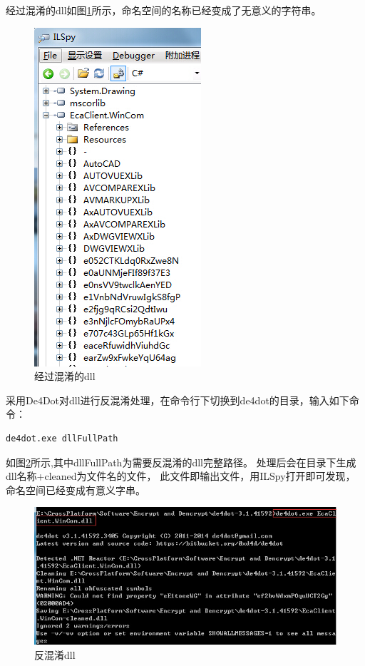 \documentclass{book}
\begin{document}
经过混淆的dll如图\ref{CodeObfuscation}所示，命名空间的名称已经变成了无意义的字符串。

\begin{figure}[htbp]
	\centering
	\includegraphics[scale=0.8]{CodeObfuscation.jpg}
	\caption{经过混淆的dll}
	\label{CodeObfuscation}
\end{figure}

采用De4Dot对dll进行反混淆处理，在命令行下切换到de4dot的目录，输入如下命令：

\begin{lstlisting}
de4dot.exe dllFullPath
\end{lstlisting}

如图\ref{DeobfuscationedDll}所示,其中dllFullPath为需要反混淆的dll完整路径。
处理后会在目录下生成dll名称+cleaned为文件名的文件，
此文件即输出文件，用ILSpy打开即可发现，命名空间已经变成有意义字串。

\begin{figure}[htbp]
	\centering
	\includegraphics[scale=0.8]{DeobfuscationedDll.jpg}
	\caption{反混淆dll}
	\label{DeobfuscationedDll}
\end{figure}
\end{document}
